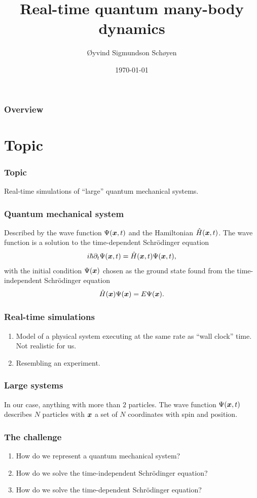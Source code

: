 \documentclass{beamer}
\author{Øyvind Sigmundson Schøyen}
\title{Real-time quantum many-body dynamics}
\institute{University of Oslo}
\date{\today}
\begin{document}
\begin{frame}
    \titlepage
\end{frame}
\begin{frame}
    \frametitle{Overview}
    \tableofcontents
\end{frame}

\section{Topic}

\begin{frame}
    \frametitle{Topic}
    Real-time simulations of ``large'' quantum mechanical systems.
\end{frame}

\begin{frame}
    \frametitle{Quantum mechanical system}
    Described by the wave function $\Psi(\boldsymbol{x}, t)$ and the Hamiltonian
    $\hat{H}(\boldsymbol{x}, t)$.
    The wave function is a solution to the time-dependent Schrödinger equation
    \begin{align}
        i\hslash \partial_t\Psi(\boldsymbol{x}, t)
        = \hat{H}(\boldsymbol{x}, t)\Psi(\boldsymbol{x}, t),
    \end{align}
    with the initial condition $\Psi(\boldsymbol{x})$ chosen as the ground state found
    from the time-independent Schrödinger equation
    \begin{align}
        \hat{H}(\boldsymbol{x})\Psi(\boldsymbol{x}) = E\Psi(\boldsymbol{x}).
    \end{align}
\end{frame}

\begin{frame}
    \frametitle{Real-time simulations}
    \begin{enumerate}
        \item Model of a physical system executing at the same rate as ``wall
            clock'' time.
            Not realistic for us.
        \item Resembling an experiment.
    \end{enumerate}
\end{frame}

\begin{frame}
    \frametitle{Large systems}
    In our case, anything with more than $2$ particles.
    The wave function $\Psi(\boldsymbol{x}, t)$ describes $N$ particles with $\boldsymbol{x}$
    a set of $N$ coordinates with spin and position.
\end{frame}

\begin{frame}
    \frametitle{The challenge}
    \begin{enumerate}
        \item How do we represent a quantum mechanical system?
        \item How do we solve the time-independent Schrödinger equation?
        \item How do we solve the time-dependent Schrödinger equation?
    \end{enumerate}
\end{frame}
\end{document}
